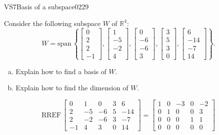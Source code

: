 \begin{exercise}{VS7}{Basis of a subspace}{0229} 
\begin{exerciseStatement} 

 Consider the following subspace \(W\) of \(\mathbb R^4\): \[W=\mathrm{span}\,\left\{ \left[\begin{array}{c}
0 \\
2 \\
2 \\
-1
\end{array}\right] , \left[\begin{array}{c}
1 \\
-5 \\
-2 \\
4
\end{array}\right] , \left[\begin{array}{c}
0 \\
-6 \\
-6 \\
3
\end{array}\right] , \left[\begin{array}{c}
3 \\
5 \\
3 \\
0
\end{array}\right] , \left[\begin{array}{c}
6 \\
-14 \\
-7 \\
14
\end{array}\right] \right\}.\] 

 

\begin{enumerate}[(a)]
\item 

Explain how to find a basis of \(W\).


\item 

Explain how to find the dimension of \(W\).


\end{enumerate}

     \end{exerciseStatement}
 \begin{exerciseAnswer} 

\[\mathrm{RREF}\,\left[\begin{array}{ccccc}
0 & 1 & 0 & 3 & 6 \\
2 & -5 & -6 & 5 & -14 \\
2 & -2 & -6 & 3 & -7 \\
-1 & 4 & 3 & 0 & 14
\end{array}\right]=\left[\begin{array}{ccccc}
1 & 0 & -3 & 0 & -2 \\
0 & 1 & 0 & 0 & 3 \\
0 & 0 & 0 & 1 & 1 \\
0 & 0 & 0 & 0 & 0
\end{array}\right]\]


\end{exerciseAnswer}
\end{exercise}
